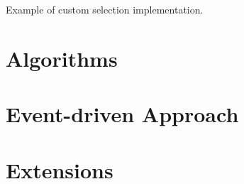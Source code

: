 \begin{listing}[ht]
	\caption{Example of custom selection implementation.}
	\label{listing:custom-selection}
\end{listing}

\section{Algorithms}
\todo

\section{Event-driven Approach}
\todo

\section{Extensions}
\todo
